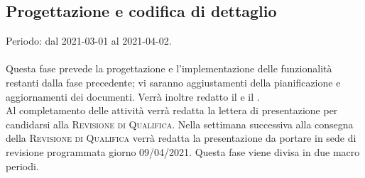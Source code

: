 \documentclass[../piano_di_progetto.tex]{subfiles}
\begin{document}
\subsection{Progettazione e codifica di dettaglio}%
\label{sub:prog_dett}
Periodo: dal 2021-03-01 al 2021-04-02.\\ \\
Questa fase prevede la progettazione e l'implementazione delle funzionalità restanti dalla fase precedente; vi saranno aggiustamenti della pianificazione e aggiornamenti dei documenti. Verrà inoltre redatto il \textsc{} e il \textsc{}. \\ %
Al completamento delle attività verrà redatta la lettera di presentazione per candidarsi alla \textsc{Revisione di Qualifica}. 
Nella settimana successiva alla consegna della \textsc{Revisione di Qualifica} verrà redatta la presentazione da portare in sede di revisione programmata giorno 09/04/2021. 
Questa fase viene divisa in due macro periodi.
\end{document}
